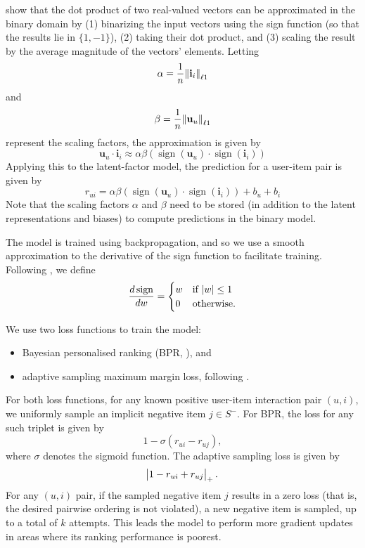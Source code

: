 \documentclass[sigchi]{acmart}
\newcommand\symUserInteractionSet{S}
\DeclareMathOperator{\sign}{sign}
\renewcommand\vec{\mathbf}
\begin{document}
\citet{rastegari2016xnor} show that the dot product of two real-valued vectors can be approximated in the binary domain by (1) binarizing the input vectors using the sign function (so that the results lie in $\{1, -1\}$), (2) taking their dot product, and (3) scaling the result by the average magnitude of the vectors' elements. Letting
\begin{equation}
\alpha = \frac{1}{n}\norm{\vec{i}_{i}}_{\ell1}
\end{equation}
and
\begin{equation}
\beta = \frac{1}{n}\norm{\vec{u}_{u}}_{\ell1}
\end{equation}
represent the scaling factors, the approximation is given by
\newcommand\binaryApproximation{ \alpha \beta\left(\sign(\vec{u}_u) \cdot \sign(\vec{i}_i)\right)}
\begin{equation}
\vec{u}_u \cdot \vec{i}_i \approx \binaryApproximation
\end{equation}
Applying this to the latent-factor model, the prediction for a user-item pair is given by
\begin{equation}
r_{ui} = \binaryApproximation + b_u + b_i
\end{equation}
Note that the scaling factors $\alpha$ and $\beta$ need to be stored (in addition to the latent representations and biases) to compute predictions in the binary model.

The model is trained using backpropagation, and so we use a smooth approximation to the derivative of the sign function to facilitate training. Following \citet{courbariaux2016binarized}, we define
\begin{equation}
  \frac{d\sign}{dw}=
  \begin{cases}
    w & \text{if}\ \abs{w} \leq 1 \\
    0 & \text{otherwise}.
  \end{cases}
\end{equation}

We use two loss functions to train the model:
\begin{itemize}
\item Bayesian personalised ranking (BPR, \citet{rendle2009bpr}), and
\item adaptive sampling maximum margin loss, following \citet{weston2011wsabie}.
\end{itemize}
For both loss functions, for any known positive user-item interaction pair $(u, i)$, we uniformly sample an implicit negative item $j \in \symUserInteractionSet^-$. For BPR, the loss for any such triplet is given by
\begin{equation}
1 - \sigma\left(r_{ui} - r_{uj}\right),
\end{equation}
where $\sigma$ denotes the sigmoid function.
The adaptive sampling loss is given by
\begin{equation}
\abs{1 - r_{ui} + r_{uj}}_{+}.
\end{equation}
For any $(u, i)$ pair, if the sampled negative item $j$ results in a zero loss (that is, the desired pairwise ordering is not violated), a new negative item is sampled, up to a total of $k$ attempts. This leads the model to perform more gradient updates in areas where its ranking performance is poorest.
\end{document}
